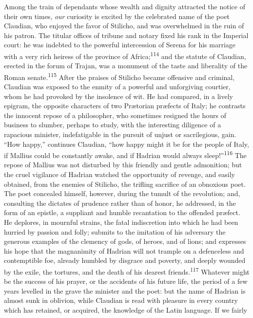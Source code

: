 Among the train of dependants whose wealth and dignity attracted
the notice of their own times, \textit{our} curiosity is excited by the
celebrated name of the poet Claudian, who enjoyed the favor of
Stilicho, and was overwhelmed in the ruin of his patron. The
titular offices of tribune and notary fixed his rank in the
Imperial court: he was indebted to the powerful intercession of
Serena for his marriage with a very rich heiress of the province
of Africa;\textsuperscript{114} and the statute of Claudian, erected in the forum
of Trajan, was a monument of the taste and liberality of the
Roman senate.\textsuperscript{115} After the praises of Stilicho became offensive
and criminal, Claudian was exposed to the enmity of a powerful
and unforgiving courtier, whom he had provoked by the insolence
of wit. He had compared, in a lively epigram, the opposite
characters of two Prætorian præfects of Italy; he contrasts the
innocent repose of a philosopher, who sometimes resigned the
hours of business to slumber, perhaps to study, with the
interesting diligence of a rapacious minister, indefatigable in
the pursuit of unjust or sacrilegious, gain. “How happy,”
continues Claudian, “how happy might it be for the people of
Italy, if Mallius could be constantly awake, and if Hadrian would
always sleep!”\textsuperscript{116} The repose of Mallius was not disturbed by
this friendly and gentle admonition; but the cruel vigilance of
Hadrian watched the opportunity of revenge, and easily obtained,
from the enemies of Stilicho, the trifling sacrifice of an
obnoxious poet. The poet concealed himself, however, during the
tumult of the revolution; and, consulting the dictates of
prudence rather than of honor, he addressed, in the form of an
epistle, a suppliant and humble recantation to the offended
præfect. He deplores, in mournful strains, the fatal
indiscretion into which he had been hurried by passion and folly;
submits to the imitation of his adversary the generous examples
of the clemency of gods, of heroes, and of lions; and expresses
his hope that the magnanimity of Hadrian will not trample on a
defenceless and contemptible foe, already humbled by disgrace and
poverty, and deeply wounded by the exile, the tortures, and the
death of his dearest friends.\textsuperscript{117} Whatever might be the success
of his prayer, or the accidents of his future life, the period of
a few years levelled in the grave the minister and the poet: but
the name of Hadrian is almost sunk in oblivion, while Claudian is
read with pleasure in every country which has retained, or
acquired, the knowledge of the Latin language. If we fairly
